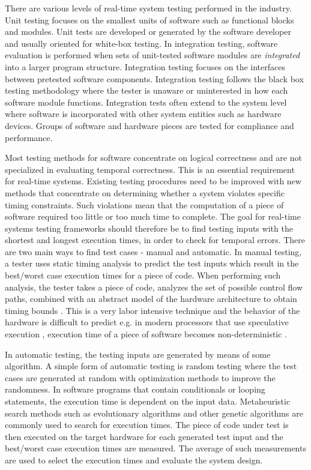 There are various levels of real-time system testing performed in the industry. Unit testing focuses on the smallest units of software such as functional blocks and modules. Unit tests are developed or generated by the software developer and usually oriented for white-box testing. In integration testing, software evaluation is performed when sets of unit-tested software modules are \emph{integrated} into a larger program structure. Integration testing focuses on the interfaces between pretested software components. Integration testing follows the black box testing methodology where the tester is unaware or uninterested in how each software module functions. Integration tests often extend to the system level where software is incorporated with other system entities such as hardware devices. Groups of software and hardware pieces are tested for compliance and performance. 

Most testing methods for software concentrate on logical correctness and are not specialized in evaluating temporal correctness. This is an essential requirement for real-time systems. Existing testing procedures need to be improved with new methods that concentrate on determining whether a system violates specific timing constraints. Such violations mean that the computation of a piece of software required too little or too much time to complete. The goal for real-time systems testing frameworks should therefore be to find testing inputs with the shortest and longest execution times, in order to check for temporal errors. There are two main ways to find test cases - manual and automatic. In manual testing, a tester uses static timing analysis to predict the test inputs which result in the best/worst case execution times for a piece of code. When performing such analysis, the tester takes a piece of code, analyzes the set of possible control flow paths, combined with an abstract model of the hardware architecture to obtain timing bounds \cite{reviewWCET}. This is a very labor intensive technique and the behavior of the hardware is difficult to predict e.g. in modern processors that use speculative execution \cite{hennessy2011computer}, execution time of a piece of software becomes non-deterministic \cite{reineke2006definition}. 

In automatic testing, the testing inputs are generated by means of some algorithm. A simple form of automatic testing is random testing where the test cases are generated at random with optimization methods to improve the randomness. In software programs that contain conditionals or looping statements, the execution time is dependent on the input data. Metaheuristic search methods such as evolutionary algorithms \cite{wegener1998verifying} and other genetic algorithms \cite{wegener1997testing, puschner1998testing} are commonly used to search for execution times. The piece of code under test is then executed on the target hardware for each generated test input and the best/worst case execution times are measured. The average of such measurements are used to select the execution times and evaluate the system design.

